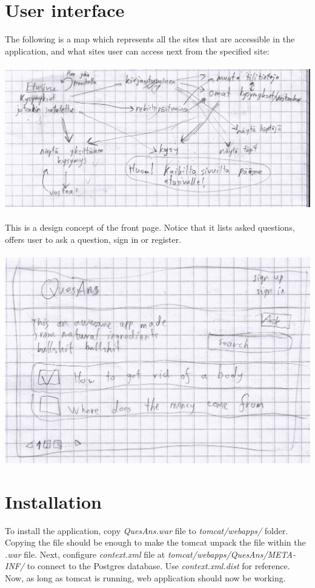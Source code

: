 \documentclass[a4paper,12pt]{article}
\begin{document}
\section{User interface}
The following is a map which represents all the sites that are accessible in the application, and what sites user can access next from the specified site:\\
\\
\includegraphics[scale=0.7]{sitemap}\\
\\
This is a design concept of the front page. Notice that it lists asked questions, offers user to ask a question, sign in or register.\\
\\
\includegraphics[scale=0.9]{FrontPage}
\newpage

\section{Installation}
To install the application, copy \emph{QuesAns.war} file to \emph{tomcat/webapps/} folder. Copying the file should be enough to make the tomcat unpack the file within the \emph{.war} file. \newline Next, configure \emph{context.xml} file at \emph{tomcat/webapps/QuesAns/META-INF/} to connect to the Postgres database. Use \emph{context.xml.dist} for reference. \newline
Now, as long as tomcat is running, web application should now be working.
\end{document}
